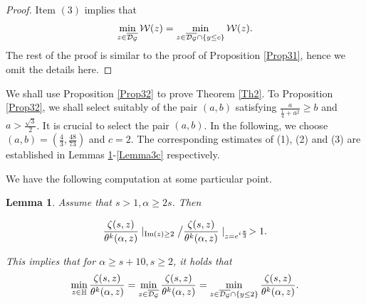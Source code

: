 \documentclass[reqno,english]{amsart}
\newtheorem{lemma}{Lemma}[section]
\newtheorem{open problem}{Open Problem}[section]
\newtheorem{open question}{Open Question}[section]
\newtheorem{open questions on hexagonal lattice}{Open Questions on hexagonal lattice}[section]
\renewcommand{\Im}{\operatorname{Im}}
\begin{document}
\begin{proof} Item $(3)$ implies that
\begin{equation}\aligned\nonumber
\min_{z\in\overline{\mathcal{D}_{\mathcal{G}}}}\mathcal{W}(z)
=\min_{z\in\overline{\mathcal{D}_{\mathcal{G}}}\cap\{y\leq c\}}\mathcal{W}(z).
\endaligned\end{equation}
The rest of the proof is similar to the proof of Proposition \ref{Prop31}, hence we omit the details here.

\end{proof}




 We shall use Proposition \ref{Prop32} to prove Theorem \ref{Th2}.
 To Proposition \ref{Prop32},
 we shall select suitably of the pair $(a,b)$ satisfying $\frac{a}{\frac{1}{4}+a^2}\geq b$ and $a>\frac{\sqrt3}{2}$.
 It is crucial to select the pair $(a,b)$. In the following, we choose $(a,b)=(\frac{4}{3},\frac{48}{73})$
 and $c=2$. The corresponding estimates of (1), (2) and (3) are established in Lemmas \ref{Lemma3a}-\ref{Lemma3c} respectively.




We have the following computation at some particular point.

\begin{lemma}\label{Lemma3a} Assume that $s>1, \alpha\geq 2s$. Then

\begin{equation}\aligned\nonumber
\frac{\zeta(s,z)}{\theta^k(\alpha,z)}\mid_{\Im(z)\geq2}
\big/\frac{\zeta(s,z)}{\theta^k(\alpha,z)}\mid_{z=e^{i\frac{\pi}{3}}}>1.
 \endaligned\end{equation}



This implies that for $\alpha\geq s+10, s\geq2$, it holds that
\begin{equation}\aligned\nonumber
\min_{z\in\mathbb{H}}\frac{\zeta(s,z)}{\theta^k(\alpha,z)}
=\min_{z\in\overline{\mathcal{D}_{\mathcal{G}}}}\frac{\zeta(s,z)}{\theta^k(\alpha,z)}
=\min_{z\in\overline{\mathcal{D}_{\mathcal{G}}}\cap\{y\leq2\}}\frac{\zeta(s,z)}{\theta^k(\alpha,z)}.
 \endaligned\end{equation}
\end{lemma}
\end{document}
